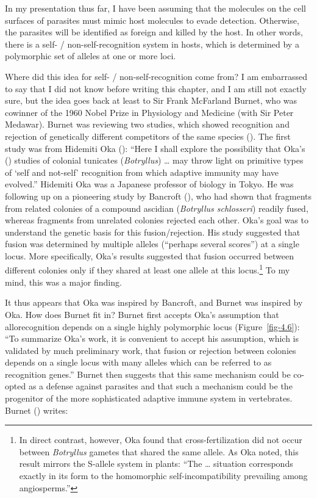 \documentclass[
  letterpaper,
]{book}
\begin{document}
In my presentation thus far, I have been assuming that the molecules on
the cell surfaces of parasites must mimic host molecules to evade
detection. Otherwise, the parasites will be identified as foreign and
killed by the host. In other words, there is a self- /
non-self-recognition system in hosts, which is determined by a
polymorphic set of alleles at one or more loci.

Where did this idea for self- / non-self-recognition come from? I am
embarrassed to say that I did not know before writing this chapter, and
I am still not exactly sure, but the idea goes back at least to Sir
Frank McFarland Burnet, who was cowinner of the 1960 Nobel Prize in
Physiology and Medicine (with Sir Peter Medawar). Burnet was reviewing
two studies, which showed recognition and rejection of genetically
different competitors of the same species
(). The first study was from
Hidemiti Oka (): ``Here I shall explore the
possibility that Oka's () studies of
colonial tunicates (\emph{Botryllus}) \ldots{} may throw light on
primitive types of `self and not-self' recognition from which adaptive
immunity may have evolved.'' Hidemiti Oka was a Japanese professor of
biology in Tokyo. He was following up on a pioneering study by Bancroft
(), who had shown that fragments from
related colonies of a compound ascidian (\emph{Botryllus schlosseri})
readily fused, whereas fragments from unrelated colonies rejected each
other. Oka's goal was to understand the genetic basis for this
fusion/rejection. His study suggested that fusion was determined by
multiple alleles (``perhaps several scores'') at a single locus. More
specifically, Oka's results suggested that fusion occurred between
different colonies only if they shared at least one allele at this
locus.\footnote{In direct contrast, however, Oka found that
  cross-fertilization did not occur between \emph{Botryllus} gametes
  that shared the same allele. As Oka noted, this result mirrors the
  S-allele system in plants: ``The \ldots{} situation corresponds
  exactly in its form to the homomorphic self-incompatibility prevailing
  among angiosperms.''} To my mind, this was a major finding.

It thus appears that Oka was inspired by Bancroft, and Burnet was
inspired by Oka. How does Burnet fit in? Burnet first accepts Oka's
assumption that allorecognition depends on a single highly polymorphic
locus (Figure~\ref{fig-4.6}): ``To summarize Oka's work, it is
convenient to accept his assumption, which is validated by much
preliminary work, that fusion or rejection between colonies depends on a
single locus with many alleles which can be referred to as recognition
genes.'' Burnet then suggests that this same mechanism could be co-opted
as a defense against parasites and that such a mechanism could be the
progenitor of the more sophisticated adaptive immune system in
vertebrates. Burnet () writes:
\end{document}

